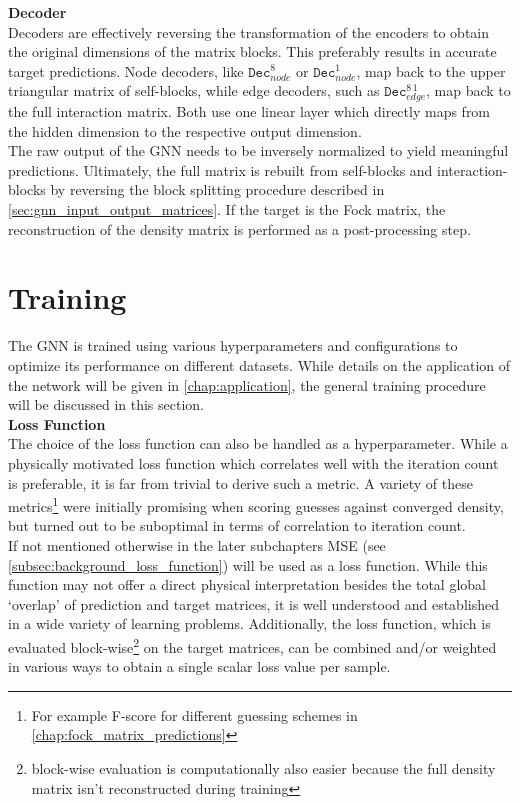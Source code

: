 \textbf{Decoder}\\
Decoders are effectively reversing the transformation of the encoders to obtain the original dimensions of the matrix blocks. This preferably results in accurate target predictions. Node decoders, like $\texttt{Dec}^{8}_{node}$ or  $\texttt{Dec}^{1}_{node}$, map back to the upper triangular matrix of self-blocks, while edge decoders, such as $\texttt{Dec}^{8\,1}_{edge}$, map back to the full interaction matrix. Both use one linear layer which directly maps from the hidden dimension to the respective output dimension. \\

The raw output of the GNN needs to be inversely normalized to yield meaningful predictions. Ultimately, the full matrix is rebuilt from self-blocks and interaction-blocks by reversing the block splitting procedure described in \autoref{sec:gnn_input_output_matrices}. If the target is the Fock matrix, the reconstruction of the density matrix is performed as a post-processing step.

\section{Training}
\label{sec:gnn_training}

The GNN is trained using various hyperparameters and configurations to optimize its performance on different datasets. While details on the application of the network will be given in \autoref{chap:application}, the general training procedure will be discussed in this section. \\

\textbf{Loss Function}\\
The choice of the loss function can also be handled as a hyperparameter. While a physically motivated loss function which correlates well with the iteration count is preferable, it is far from trivial to derive such a metric. A variety of these metrics\footnote{For example F-score for different guessing schemes in \autoref{chap:fock_matrix_predictions}} were initially promising when scoring guesses against converged density, but turned out to be suboptimal in terms of correlation to iteration count. \\
If not mentioned otherwise in the later subchapters MSE (see \autoref{subsec:background_loss_function}) will be used as a loss function. While this function may not offer a direct physical interpretation besides the total global `overlap' of prediction and target matrices, it is well understood and established in a wide variety of learning problems. Additionally, the loss function, which is evaluated block-wise\footnote{block-wise evaluation is computationally also easier because the full density matrix isn't reconstructed during training} on the target matrices, can be combined and/or weighted in various ways to obtain a single scalar loss value per sample. 

